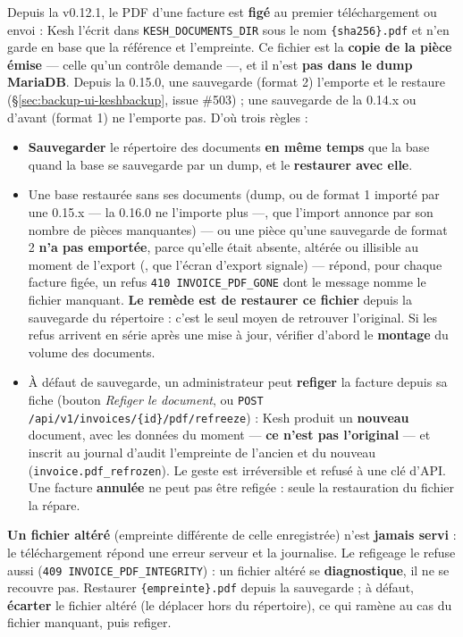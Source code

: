 \documentclass[a4paper,11pt,oneside]{article}
\begin{document}
Depuis la v0.12.1, le PDF d'une facture est \textbf{figé} au premier téléchargement ou envoi : Kesh l'écrit dans \texttt{KESH\_DOCUMENTS\_DIR} sous le nom \texttt{\{sha256\}.pdf} et n'en garde en base que la référence et l'empreinte. Ce fichier est la \textbf{copie de la pièce émise} --- celle qu'un contrôle demande ---, et il n'est \textbf{pas dans le dump MariaDB}. Depuis la 0.15.0, une sauvegarde  (format 2) l'emporte et le restaure (\S\ref{sec:backup-ui-keshbackup}, issue \#503) ; une sauvegarde de la 0.14.x ou d'avant (format 1) ne l'emporte pas. D'où trois règles :

\begin{itemize}
    \item \textbf{Sauvegarder} le répertoire des documents \textbf{en même temps} que la base quand la base se sauvegarde par un dump, et le \textbf{restaurer avec elle}.
    \item Une base restaurée sans ses documents (dump, ou  de format 1 importé par une 0.15.x --- la 0.16.0 ne l'importe plus ---, que l'import annonce par son nombre de pièces manquantes) --- ou une pièce qu'une sauvegarde de format 2 \textbf{n'a pas emportée}, parce qu'elle était absente, altérée ou illisible au moment de l'export (, que l'écran d'export signale) --- répond, pour chaque facture figée, un refus \texttt{410 INVOICE\_PDF\_GONE} dont le message nomme le fichier manquant. \textbf{Le remède est de restaurer ce fichier} depuis la sauvegarde du répertoire : c'est le seul moyen de retrouver l'original. Si les refus arrivent en série après une mise à jour, vérifier d'abord le \textbf{montage} du volume des documents.
    \item À défaut de sauvegarde, un administrateur peut \textbf{refiger} la facture depuis sa fiche (bouton \emph{Refiger le document}, ou \texttt{POST /api/v1/invoices/\{id\}/pdf/refreeze}) : Kesh produit un \textbf{nouveau} document, avec les données du moment --- \textbf{ce n'est pas l'original} --- et inscrit au journal d'audit l'empreinte de l'ancien et du nouveau (\texttt{invoice.pdf\_refrozen}). Le geste est irréversible et refusé à une clé d'API. Une facture \textbf{annulée} ne peut pas être refigée : seule la restauration du fichier la répare.
\end{itemize}

\begin{keshwarning}
\textbf{Un fichier altéré} (empreinte différente de celle enregistrée) n'est \textbf{jamais servi} : le téléchargement répond une erreur serveur et la journalise. Le refigeage le refuse aussi (\texttt{409 INVOICE\_PDF\_INTEGRITY}) : un fichier altéré se \textbf{diagnostique}, il ne se recouvre pas. Restaurer \texttt{\{empreinte\}.pdf} depuis la sauvegarde ; à défaut, \textbf{écarter} le fichier altéré (le déplacer hors du répertoire), ce qui ramène au cas du fichier manquant, puis refiger.
\end{keshwarning}
\end{document}
